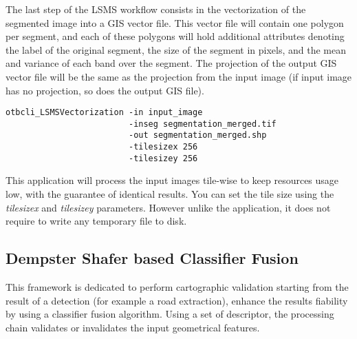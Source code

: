 The last step of the LSMS workflow consists in the vectorization of the
segmented image into a GIS vector file. This vector file will contain
one polygon per segment, and each of these polygons will hold
additional attributes denoting the label of the original segment, the
size of the segment in pixels, and the mean and variance of each band
over the segment. The projection of the output GIS vector file will be
the same as the projection from the input image (if input image has no
projection, so does the output GIS file).

\begin{verbatim}
otbcli_LSMSVectorization -in input_image 
                         -inseg segmentation_merged.tif 
                         -out segmentation_merged.shp 
                         -tilesizex 256 
                         -tilesizey 256
\end{verbatim}

This application will process the input images tile-wise
to keep resources usage low, with the guarantee of identical
results. You can set the tile size using the \emph{tilesizex} and
\emph{tilesizey} parameters. However unlike the
 application, it does not require to
write any temporary file to disk.

\subsection{Dempster Shafer based Classifier Fusion}\label{ssec:classifierfusion}

This framework is dedicated to perform cartographic validation starting
from the result of a detection (for example a road extraction), enhance
the results fiability by using a classifier fusion algorithm. Using a
set of descriptor, the processing chain validates or invalidates the
input geometrical features.

%

